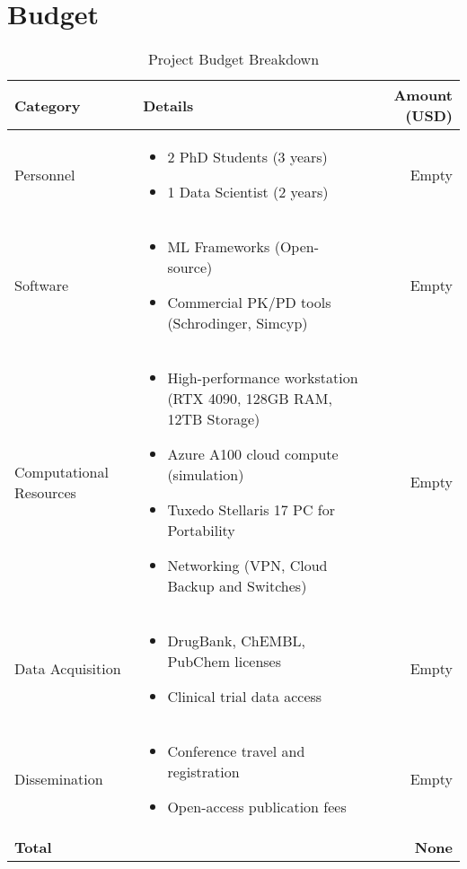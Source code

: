 \chapter*{Budget}

\begin{table}[h!]
    \centering
    \caption{Project Budget Breakdown}
    \begin{tabularx}{\textwidth}{l X r}
        \toprule
        \textbf{Category} & \textbf{Details} & \textbf{Amount (USD)} \\
        \midrule
        Personnel & 
        \begin{itemize}
            \item 2 PhD Students (3 years)
            \item 1 Data Scientist (2 years)
        \end{itemize} 
        & Empty \\
        Software & 
        \begin{itemize}
            \item ML Frameworks (Open-source)
            \item Commercial PK/PD tools (Schrodinger, Simcyp)
        \end{itemize} 
        & Empty \\
        Computational Resources & 
        \begin{itemize}
            \item High-performance workstation (RTX 4090, 128GB RAM, 12TB Storage)
            \item Azure A100 cloud compute (simulation)
            \item Tuxedo Stellaris 17 PC for Portability
            \item Networking (VPN, Cloud Backup and Switches)
        \end{itemize}
        & Empty \\
        Data Acquisition & 
        \begin{itemize}
            \item DrugBank, ChEMBL, PubChem licenses
            \item Clinical trial data access
        \end{itemize}
        & Empty \\
        Dissemination & 
        \begin{itemize}
            \item Conference travel and registration
            \item Open-access publication fees
        \end{itemize}
        & Empty \\
        \midrule
        \textbf{Total} & & \textbf{None} \\
        \bottomrule
    \end{tabularx}
\end{table}